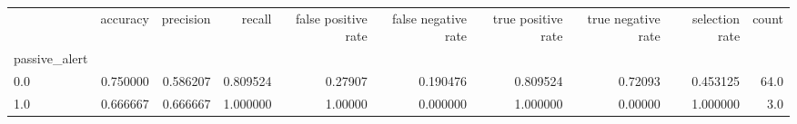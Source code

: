 \begin{tabular}{lrrrrrrrrr}
\toprule
{} &  accuracy &  precision &    recall &  false positive rate &  false negative rate &  true positive rate &  true negative rate &  selection rate &  count \\
passive\_alert &           &            &           &                      &                      &                     &                     &                 &        \\
\midrule
0.0           &  0.750000 &   0.586207 &  0.809524 &              0.27907 &             0.190476 &            0.809524 &             0.72093 &        0.453125 &   64.0 \\
1.0           &  0.666667 &   0.666667 &  1.000000 &              1.00000 &             0.000000 &            1.000000 &             0.00000 &        1.000000 &    3.0 \\
\bottomrule
\end{tabular}
